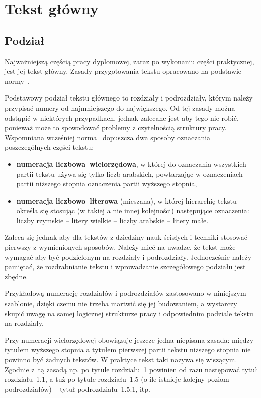 \chapter{Tekst główny}
\section{Podział}
Najważniejszą częścią pracy dyplomowej, zaraz po wykonaniu części praktycznej, jest jej tekst główny. Zasady przygotowania tekstu opracowano na podstawie normy~\cite{Norma}.

Podstawowy podział tekstu głównego to rozdziały i podrozdziały, którym należy przypisać numery od najmniejszego do największego. Od tej zasady można odstąpić w niektórych przypadkach, jednak zalecane jest aby tego nie robić, ponieważ może to spowodować problemy z czytelnością struktury pracy. Wspomniana wcześniej norma~\cite{Norma} dopuszcza dwa sposoby oznaczania poszczególnych części tekstu:
\begin{itemize}
\item \textbf{numeracja liczbowa--wielorzędowa}, w której do oznaczania wszystkich partii tekstu używa się tylko liczb arabskich, powtarzając w oznaczeniach partii niższego stopnia oznaczenia partii wyższego stopnia,
\item \textbf{numeracja liczbowo--literowa} (mieszana), w której hierarchię tekstu określa się stosując (w takiej a nie innej kolejności) następujące oznaczenia: liczby rzymskie -- litery wielkie -- liczby arabskie -- litery małe.
\end{itemize}
Zaleca się jednak aby dla tekstów z dziedziny nauk ścisłych i techniki stosować pierwszy z wymienionych sposobów. Należy mieć na uwadze, że tekst może wymagać aby być podzielonym na rozdziały i podrozdziały. Jednocześnie należy pamiętać, że rozdrabnianie tekstu i wprowadzanie szczegółowego podziału jest zbędne. 

Przykładową numerację rozdziałów i podrozdziałów zastosowano w niniejszym szablonie, dzięki czemu nie trzeba martwić się jej budowaniem, a wystarczy skupić uwagę na samej logicznej strukturze pracy i odpowiednim podziale tekstu na rozdziały.

Przy numeracji wielorzędowej obowiązuje jeszcze jedna niepisana zasada: między tytułem wyższego stopnia a tytułem pierwszej partii tekstu niższego stopnia nie powinno być żadnych tekstów. W praktyce tekst taki nazywa się wiszącym. Zgodnie z~tą zasadą np. po tytule rozdziału~1 powinien od razu następować tytuł rozdziału~1.1, a tuż po tytule rozdziału~1.5 (o ile istnieje kolejny poziom podrozdziałów) -- tytuł podrozdziału~1.5.1, itp.

